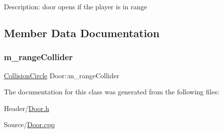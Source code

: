 Description\+: door opens if the player is in range 

\subsection{Member Data Documentation}
\mbox{\label{class_door_a671b74fd40342beadc202df82132621b}} 
\subsubsection{\texorpdfstring{m\_rangeCollider}{m\_rangeCollider}}
{\footnotesize\ttfamily \mbox{\hyperlink{class_collision_circle}{Collision\+Circle}} Door\+::m\+\_\+range\+Collider}



The documentation for this class was generated from the following files\+:\begin{DoxyCompactItemize}
\item 
Header/\mbox{\hyperlink{_door_8h}{Door.\+h}}\item 
Source/\mbox{\hyperlink{_door_8cpp}{Door.\+cpp}}\end{DoxyCompactItemize}
